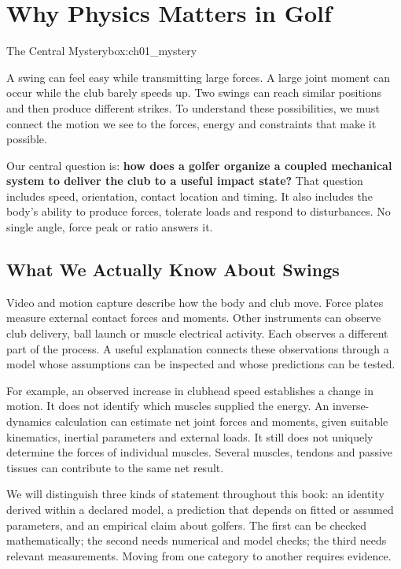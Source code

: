\chapter{Why Physics Matters in Golf}\label{ch:01_why_physics}

\begin{laymansbox}{The Central Mystery}{box:ch01_mystery}

A swing can feel easy while transmitting large forces. A large joint moment can occur while the club barely speeds up. Two swings can reach similar positions and then produce different strikes. To understand these possibilities, we must connect the motion we see to the forces, energy and constraints that make it possible.

Our central question is: \textbf{how does a golfer organize a coupled mechanical system to deliver the club to a useful impact state?} That question includes speed, orientation, contact location and timing. It also includes the body's ability to produce forces, tolerate loads and respond to disturbances. No single angle, force peak or ratio answers it.

\end{laymansbox}

\section{What We Actually Know About Swings}\label{ch01:what-we-actually-know-about-swings}

Video and motion capture describe how the body and club move. Force plates measure external contact forces and moments. Other instruments can observe club delivery, ball launch or muscle electrical activity. Each observes a different part of the process. A useful explanation connects these observations through a model whose assumptions can be inspected and whose predictions can be tested.

For example, an observed increase in clubhead speed establishes a change in motion. It does not identify which muscles supplied the energy. An inverse-dynamics calculation can estimate net joint forces and moments, given suitable kinematics, inertial parameters and external loads. It still does not uniquely determine the forces of individual muscles. Several muscles, tendons and passive tissues can contribute to the same net result.

We will distinguish three kinds of statement throughout this book: an identity derived within a declared model, a prediction that depends on fitted or assumed parameters, and an empirical claim about golfers. The first can be checked mathematically; the second needs numerical and model checks; the third needs relevant measurements. Moving from one category to another requires evidence.

